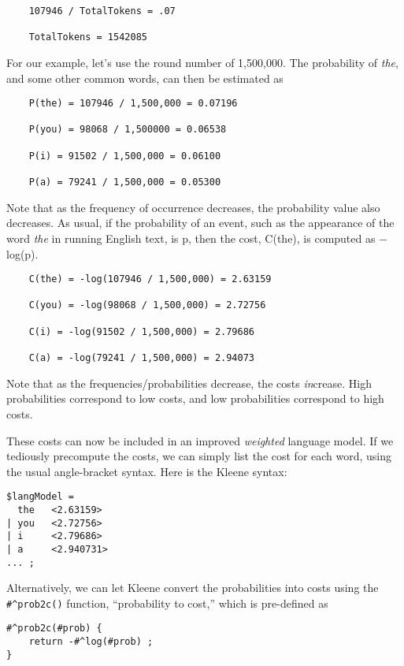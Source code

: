 \begin{Verbatim}
	107946 / TotalTokens = .07

	TotalTokens = 1542085
\end{Verbatim}

\noindent
For our example, let's use the round number of 1,500,000.  The probability of \emph{the}, and some
other common words, can then be estimated as

\begin{Verbatim}
	P(the) = 107946 / 1,500,000 = 0.07196

	P(you) = 98068 / 1,500000 = 0.06538

	P(i) = 91502 / 1,500,000 = 0.06100

	P(a) = 79241 / 1,500,000 = 0.05300
\end{Verbatim}

\noindent
Note that as the frequency of occurrence decreases, the probability value also decreases.  
As usual, if the probability of an event, such as the appearance of the word \emph{the} in
running English text, is p,
then the cost, C(the), is computed as $-$log(p).

\begin{Verbatim}
	C(the) = -log(107946 / 1,500,000) = 2.63159

	C(you) = -log(98068 / 1,500,000) = 2.72756

	C(i) = -log(91502 / 1,500,000) = 2.79686

	C(a) = -log(79241 / 1,500,000) = 2.94073
\end{Verbatim}

\noindent
Note that as the frequencies/probabilities decrease, the costs \emph{in}crease.
High probabilities correspond to low costs, and low probabilities correspond to
high costs.

These costs can now be included in an improved \emph{weighted} language model.  If we tediously precompute
the costs, we can simply list the cost for each word, using the usual
angle-bracket syntax.  Here is the Kleene syntax:

\begin{Verbatim}
$langModel = 
  the   <2.63159>
| you   <2.72756>
| i     <2.79686>
| a     <2.940731>
... ;
\end{Verbatim}

\noindent
Alternatively, we can let Kleene convert the probabilities into costs using the
\verb!#^prob2c()! function, ``probability to cost,'' which is pre-defined as 

\begin{Verbatim}
#^prob2c(#prob) {
    return -#^log(#prob) ;
}
\end{Verbatim}

